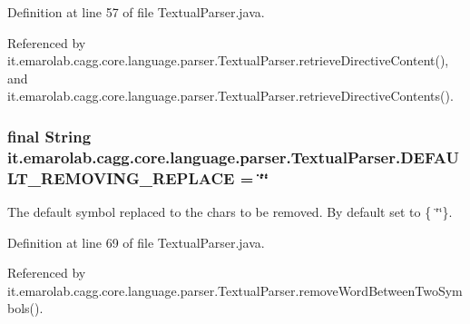 Definition at line 57 of file Textual\-Parser.\-java.



Referenced by it.\-emarolab.\-cagg.\-core.\-language.\-parser.\-Textual\-Parser.\-retrieve\-Directive\-Content(), and it.\-emarolab.\-cagg.\-core.\-language.\-parser.\-Textual\-Parser.\-retrieve\-Directive\-Contents().

\hypertarget{classit_1_1emarolab_1_1cagg_1_1core_1_1language_1_1parser_1_1TextualParser_af6d5a2a80151c759e69c0bbbc306a3f0}{
\subsubsection[{D\-E\-F\-A\-U\-L\-T\-\_\-\-R\-E\-M\-O\-V\-I\-N\-G\-\_\-\-R\-E\-P\-L\-A\-C\-E}]{\setlength{\rightskip}{0pt plus 5cm}final String it.\-emarolab.\-cagg.\-core.\-language.\-parser.\-Textual\-Parser.\-D\-E\-F\-A\-U\-L\-T\-\_\-\-R\-E\-M\-O\-V\-I\-N\-G\-\_\-\-R\-E\-P\-L\-A\-C\-E = \char`\"{}\char`\"{}\hspace{0.3cm}{\ttfamily [static]}}}\label{classit_1_1emarolab_1_1cagg_1_1core_1_1language_1_1parser_1_1TextualParser_af6d5a2a80151c759e69c0bbbc306a3f0}
The default symbol replaced to the chars to be removed. By default set to \{ \char`\"{}\char`\"{}\}. 

Definition at line 69 of file Textual\-Parser.\-java.



Referenced by it.\-emarolab.\-cagg.\-core.\-language.\-parser.\-Textual\-Parser.\-remove\-Word\-Between\-Two\-Symbols().

